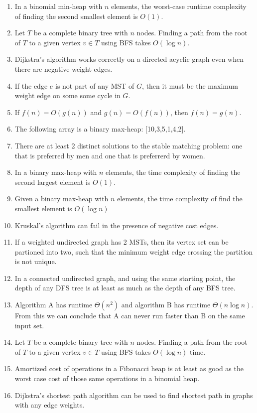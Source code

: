 \documentclass[12pt]{article}
\begin{document}
\begin{enumerate}
    \item In a binomial min-heap with $n$ elements, the worst-case runtime complexity of finding the second smallest element is $O(1)$.
    \item Let $T$ be a complete binary tree with $n$ nodes. Finding a path from the root of $T$ to a given vertex $v\in T$ using BFS takes $O(\log n)$.
    \item Dijkstra's algorithm works correctly on a directed acyclic graph even when there are negative-weight edges.
    \item If the edge $e$ is not part of any MST of $G$, then it must be the maximum weight edge on some some cycle in $G$.
    \item If $f(n)=O(g(n))$ and $g(n)=O(f(n))$, then $f(n)=g(n)$.
    \item The following array is a binary max-heap: [10,3,5,1,4,2].
    \item There are at least 2 distinct solutions to the stable matching problem: one that is preferred by men and one that is preferrerd by women.
    \item In a binary max-heap with $n$ elements, the time complexity of finding the second largest element is $O(1)$.
    \item Given a binary max-heap with $n$ elements, the time complexity of find the smallest element is $O(\log n)$
    \item Kruskal's algorithm can fail in the presence of negative cost edges.
    \item If a weighted undirected graph has 2 MSTs, then its vertex set can be partioned into two, such that the minimum weight edge crossing the partition is not unique.
    \item In a connected undirected graph, and using the same starting point, the depth of any DFS tree is at least as much as the depth of any BFS tree.
    \item Algorithm A has runtime $\Theta(n^2)$ and algorithm B has runtime $\Theta(n\log n)$. From this we can conclude that A can never run faster than B on the same input set.
    \item Let $T$ be a complete binary tree with $n$ nodes. Finding a path from the root of $T$ to a given vertex $v\in T$ using BFS takes $O(\log n)$ time.
    \item Amortized cost of operations in a Fibonacci heap is at least as good as the worst case cost of those same operations in a binomial heap.
    \item Dijkstra's shortest path algorithm can be used to find shortest path in graphs with any edge weights.

\end{enumerate}
\end{document}
